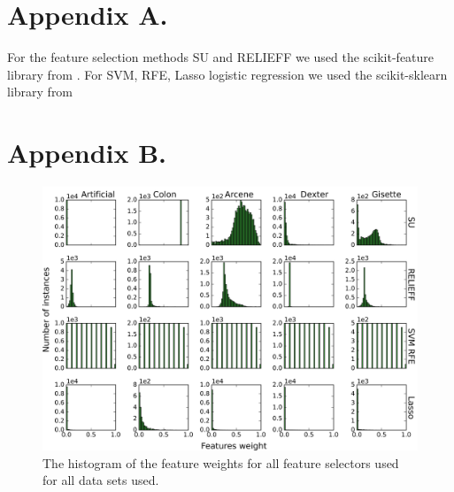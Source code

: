 \documentclass[twoside,11pt]{article}
\begin{document}
\newpage

\appendix
\section*{Appendix A.}
For the feature selection methods SU and RELIEFF we used the scikit-feature library from \cite{Li-etal16}.
For SVM, RFE, Lasso logistic regression we used the scikit-sklearn library from \cite{scikit-learn}
\label{app:appendixa}
\section*{Appendix B.}
\label{app:appendixb}

\begin{figure}[h!]
  \centering
    \includegraphics[width=\textwidth]{feature_weights_hist.png}
  \caption{The histogram of the feature weights for all feature selectors used for all data sets used.}
  \label{fig:feature_weights_hist}
\end{figure}

\vskip 0.2in

\end{document}
